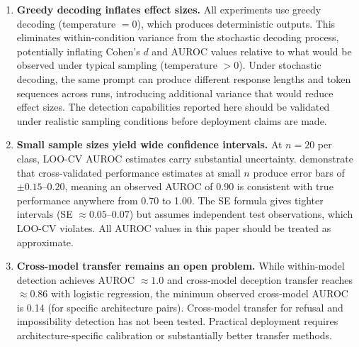 \begin{enumerate}[leftmargin=*]
    \item \textbf{Greedy decoding inflates effect sizes.} All experiments use greedy decoding (temperature $= 0$), which produces deterministic outputs. This eliminates within-condition variance from the stochastic decoding process, potentially inflating Cohen's $d$ and AUROC values relative to what would be observed under typical sampling (temperature $> 0$). Under stochastic decoding, the same prompt can produce different response lengths and token sequences across runs, introducing additional variance that would reduce effect sizes. The detection capabilities reported here should be validated under realistic sampling conditions before deployment claims are made.

    \item \textbf{Small sample sizes yield wide confidence intervals.} At $n = 20$ per class, LOO-CV AUROC estimates carry substantial uncertainty. \citet{varoquaux2018cross} demonstrate that cross-validated performance estimates at small $n$ produce error bars of $\pm 0.15$--$0.20$, meaning an observed AUROC of 0.90 is consistent with true performance anywhere from 0.70 to 1.00. The \citet{hanley1982meaning} SE formula gives tighter intervals (SE $\approx 0.05$--$0.07$) but assumes independent test observations, which LOO-CV violates. All AUROC values in this paper should be treated as approximate.

    \item \textbf{Cross-model transfer remains an open problem.} While within-model detection achieves AUROC $\approx 1.0$ and cross-model deception transfer reaches $\approx 0.86$ with logistic regression, the minimum observed cross-model AUROC is 0.14 (for specific architecture pairs). Cross-model transfer for refusal and impossibility detection has not been tested. Practical deployment requires architecture-specific calibration or substantially better transfer methods.
\end{enumerate}
